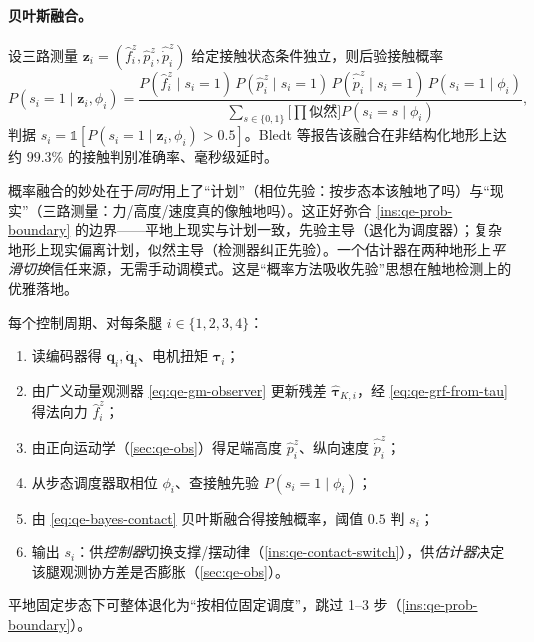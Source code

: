 \paragraph{贝叶斯融合。}
设三路测量 $\boldsymbol z_i=(\hat f_i^z,\hat p_i^z,\hat{\dot p}_i^z)$ 给定接触状态条件独立，则后验接触概率
\begin{equation}
  P(s_i=1\mid\boldsymbol z_i,\phi_i)
  = \frac{P(\hat f_i^z\mid s_i{=}1)\,P(\hat p_i^z\mid s_i{=}1)\,P(\hat{\dot p}_i^z\mid s_i{=}1)\,P(s_i{=}1\mid\phi_i)}{\sum_{s\in\{0,1\}}\big[\textstyle\prod\text{似然}\big]P(s_i{=}s\mid\phi_i)},
  \label{eq:qe-bayes-contact}
\end{equation}
判据 $s_i=\mathbb{1}[P(s_i{=}1\mid\boldsymbol z_i,\phi_i)>0.5]$。Bledt 等报告该融合在非结构化地形上达约 $99.3\%$ 的接触判别准确率、毫秒级延时\cite{bledt2018contact}。

\begin{insight}[相位先验 $\times$ 测量似然 $=$ 计划与现实的折中]\label{ins:qe-prob-fusion}
概率融合的妙处在于\emph{同时}用上了“计划”（相位先验：按步态本该触地了吗）与“现实”（三路测量：力/高度/速度真的像触地吗）。这正好弥合 \cref{ins:qe-prob-boundary} 的边界——平地上现实与计划一致，先验主导（退化为调度器）；复杂地形上现实偏离计划，似然主导（检测器纠正先验）。一个估计器在两种地形上\emph{平滑切换}信任来源，无需手动调模式。这是“概率方法吸收先验”思想在触地检测上的优雅落地。
\end{insight}

\begin{algo}[四足触地检测整体流程]\label{algo:qe-contact}
每个控制周期、对每条腿 $i\in\{1,2,3,4\}$：
\begin{enumerate}
  \item 读编码器得 $\boldsymbol q_i,\dot{\boldsymbol q}_i$、电机扭矩 $\boldsymbol\tau_i$；
  \item 由广义动量观测器 \cref{eq:qe-gm-observer} 更新残差 $\hat{\boldsymbol\tau}_{K,i}$，经 \cref{eq:qe-grf-from-tau} 得法向力 $\hat f_i^z$；
  \item 由正向运动学（\cref{sec:qe-obs}）得足端高度 $\hat p_i^z$、纵向速度 $\hat{\dot p}_i^z$；
  \item 从步态调度器取相位 $\phi_i$、查接触先验 $P(s_i{=}1\mid\phi_i)$；
  \item 由 \cref{eq:qe-bayes-contact} 贝叶斯融合得接触概率，阈值 $0.5$ 判 $s_i$；
  \item 输出 $s_i$：供\emph{控制器}切换支撑/摆动律（\cref{ins:qe-contact-switch}），供\emph{估计器}决定该腿观测协方差是否膨胀（\cref{sec:qe-obs}）。
\end{enumerate}
平地固定步态下可整体退化为“按相位固定调度”，跳过 1--3 步（\cref{ins:qe-prob-boundary}）。
\end{algo}

